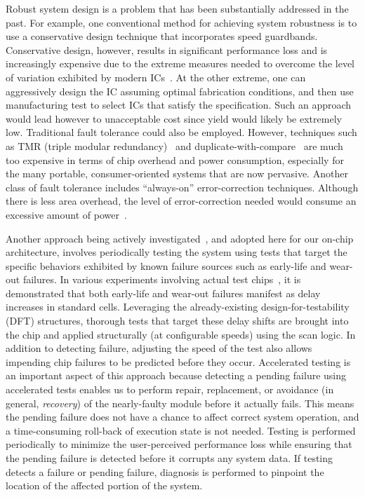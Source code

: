 Robust system design is a problem that has been substantially addressed in the past.
%
For example, one conventional method for achieving system robustness is to use a conservative design technique that incorporates speed guardbands.
%
Conservative design, however, results in significant performance loss and is increasingly expensive due to the extreme measures needed to overcome the level of variation exhibited by modern ICs~\cite{jeong09}.
%
At the other extreme, one can aggressively design the IC assuming optimal fabrication conditions, and then use manufacturing test to select ICs that satisfy the specification.
%
Such an approach would lead however to unacceptable cost since yield would likely be extremely low.
%
Traditional fault tolerance could also be employed.
%
However, techniques such as TMR (triple modular redundancy)~\cite{stroud94,radu00} and duplicate-with-compare~\cite{johnson08} are much too expensive in terms of chip overhead and power consumption, especially for the many portable, consumer-oriented systems that are now pervasive.
%
Another class of fault tolerance includes ``always-on'' error-correction techniques.
%
Although there is less area overhead, the level of error-correction needed would consume an excessive amount of power~\cite{siewiorek98}.%

Another approach being actively investigated~\cite{li08,inoue08,li10casp,li13}, and adopted here for our on-chip architecture, involves periodically testing the system using tests that target the specific behaviors exhibited by known failure sources such as early-life and wear-out failures.
%
In various experiments involving actual test chips~\cite{agarwal07,chen09}, it is demonstrated that both early-life and wear-out failures manifest as delay increases in standard cells.
%
Leveraging the already-existing design-for-testability (DFT) structures, thorough tests that target these delay shifts are brought into the chip and applied structurally (at configurable speeds) using the scan logic.
%
In addition to detecting failure, adjusting the speed of the test also allows impending chip failures to be predicted before they occur.
%
Accelerated testing is an important aspect of this approach because detecting a pending failure using accelerated tests enables us to perform repair, replacement, or avoidance (in general, \textit{recovery}) of the nearly-faulty module before it actually fails.
%
This means the pending failure does not have a chance to affect correct system operation, and a time-consuming roll-back of execution state is not needed.
%
Testing is performed periodically to minimize the user-perceived performance loss while ensuring that the pending failure is detected before it corrupts any system data.
%
If testing detects a failure or pending failure, diagnosis is performed to pinpoint the location of the affected portion of the system.

